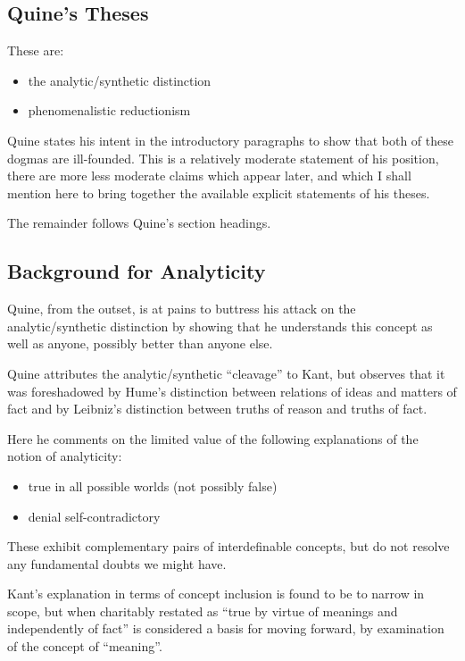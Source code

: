 \subsection{Quine's Theses}

These are:
\begin{itemize}
\item the analytic/synthetic distinction
\item phenomenalistic reductionism
\end{itemize}

Quine states his intent in the introductory paragraphs to show that both of these dogmas are ill-founded.
This is a relatively moderate statement of his position, there are more less moderate claims which appear later, and which I shall mention here to bring together the available explicit statements of his theses.

The remainder follows Quine's section headings.

\newtheorem{TD}{}{}{}

\subsection{Background for Analyticity}
Quine, from the outset, is at pains to buttress his attack on the analytic/synthetic distinction by showing that he understands this concept as well as anyone, possibly better than anyone else.

Quine attributes the analytic/synthetic ``cleavage'' to Kant, but observes that it was foreshadowed by Hume's distinction between relations of ideas and matters of fact and by Leibniz's distinction between truths of reason and truths of fact.

Here he comments on the limited value of the following explanations of the notion of analyticity:

\begin{itemize}
\item true in all possible worlds (not possibly false)
\item denial self-contradictory
\end{itemize}

These exhibit complementary pairs of interdefinable concepts, but do not resolve any fundamental doubts we might have.

Kant's explanation in terms of concept inclusion is found to be to narrow in scope, but when charitably restated as ``true by virtue of meanings and independently of fact'' is considered a basis for moving forward, by examination of the concept of ``meaning''.

